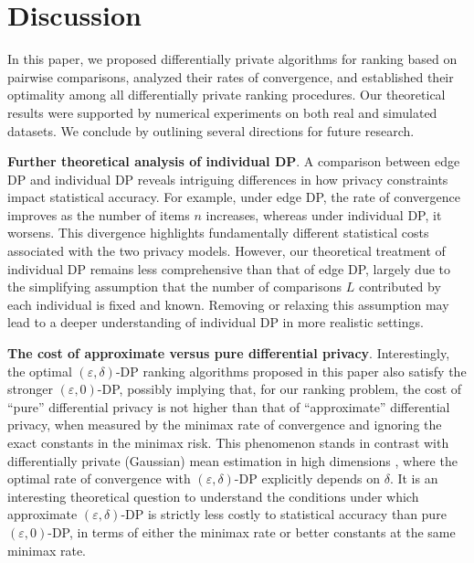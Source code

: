 \documentclass[letterpaper,12pt]{article}
\numberwithin{equation}{section}
\theoremstyle{plain}
\numberwithin{Theorem}{section}
\numberwithin{corollary}{section}
\numberwithin{proposition}{section}
\numberwithin{Lemma}{section}
{
	\theoremstyle{definition}
	\newtheorem{Definition}{Definition}
	\newtheorem{example}{Example}
	\numberwithin{example}{section}
	\newtheorem{fact}{Fact}
	\numberwithin{fact}{section}
	\newtheorem{remark}{Remark}
}
\newcommand{\1}{\mathbbm{1}}
\begin{document}
\section{Discussion}\label{sec: discussion}

In this paper, we proposed differentially private algorithms for ranking based on pairwise comparisons, analyzed their rates of convergence, and established their optimality among all differentially private ranking procedures. Our theoretical results were supported by numerical experiments on both real and simulated datasets. We conclude by outlining several directions for future research.

{\bf Further theoretical analysis of individual DP}. A comparison between edge DP and individual DP reveals intriguing differences in how privacy constraints impact statistical accuracy. For example, under edge DP, the rate of convergence improves as the number of items $n$ increases, whereas under individual DP, it worsens. This divergence highlights fundamentally different statistical costs associated with the two privacy models. However, our theoretical treatment of individual DP remains less comprehensive than that of edge DP, largely due to the simplifying assumption that the number of comparisons $L$ contributed by each individual is fixed and known. Removing or relaxing this assumption may lead to a deeper understanding of individual DP in more realistic settings.



{\bf The cost of approximate versus pure differential privacy}.
Interestingly, the optimal $(\varepsilon, \delta)$-DP ranking algorithms proposed in this paper also satisfy the stronger $(\varepsilon, 0)$-DP, possibly implying that, for our ranking problem, the cost of ``pure'' differential privacy is not higher than that of 	``approximate'' differential privacy, when measured by the minimax rate of convergence and ignoring the exact constants in the minimax risk. This phenomenon stands in contrast with differentially private (Gaussian) mean estimation in high dimensions \cite{barber2014privacy, steinke2017between, cai2021cost}, where the optimal rate of convergence with $(\varepsilon, \delta)$-DP explicitly depends on $\delta$. It is an interesting theoretical question to understand the conditions under which approximate $(\varepsilon, \delta)$-DP is strictly less costly to statistical accuracy than pure $(\varepsilon, 0)$-DP, in terms of either the minimax rate or better constants at the same minimax rate.
\end{document}
